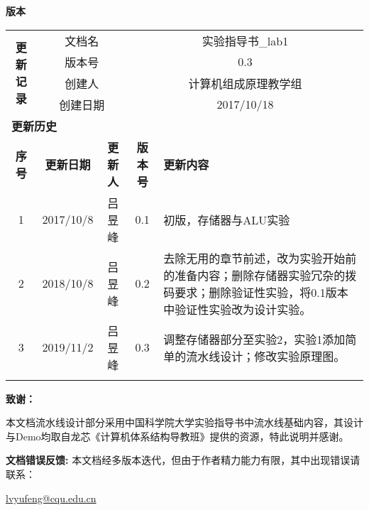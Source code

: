 \textbf{版本}

\begin{table}[htbp]
    \centering
    \begin{tabular}{|c|c|c|c|p{6cm}|}
        \hline
        \multirow{4}{*}{\textbf{更新记录}} & \multicolumn{2}{c|}{文档名} & \multicolumn{2}{c|}{实验指导书\_lab1} \\
        \cline{2-5} & \multicolumn{2}{c|}{版本号} & \multicolumn{2}{c|}{0.3} \\
        \cline{2-5} & \multicolumn{2}{c|}{创建人} & \multicolumn{2}{c|}{计算机组成原理教学组} \\
        \cline{2-5} & \multicolumn{2}{c|}{创建日期} & \multicolumn{2}{c|}{2017/10/18} \\
        \hline
        \multicolumn{5}{|l|}{\textbf{更新历史}} \\
        \hline
        \textbf{序号} & \textbf{更新日期} & \textbf{更新人} & \textbf{版本号} & \textbf{更新内容} \\
        \hline 
        1 & 2017/10/8 & 吕昱峰 & 0.1 & 初版，存储器与ALU实验\\
        \hline
        2 & 2018/10/8 & 吕昱峰 & 0.2 & 去除无用的章节前述，改为实验开始前的准备内容；删除存储器实验冗杂的拨码要求；删除验证性实验，将0.1版本中验证性实验改为设计实验。\\
        \hline
        3 &2019/11/2 & 吕昱峰 & 0.3 & 调整存储器部分至实验2，实验1添加简单的流水线设计；修改实验原理图。\\
        \hline
         & & & & \\
        \hline
    \end{tabular}
    \label{tab:guide_book_version}
\end{table}



\textbf{致谢：}

本文档流水线设计部分采用中国科学院大学实验指导书中流水线基础内容，其设计与Demo均取自龙芯《计算机体系结构导教班》提供的资源，特此说明并感谢。

\textbf{文档错误反馈:}
本文档经多版本迭代，但由于作者精力能力有限，其中出现错误请联系：

\url{lvyufeng@cqu.edu.cn}
